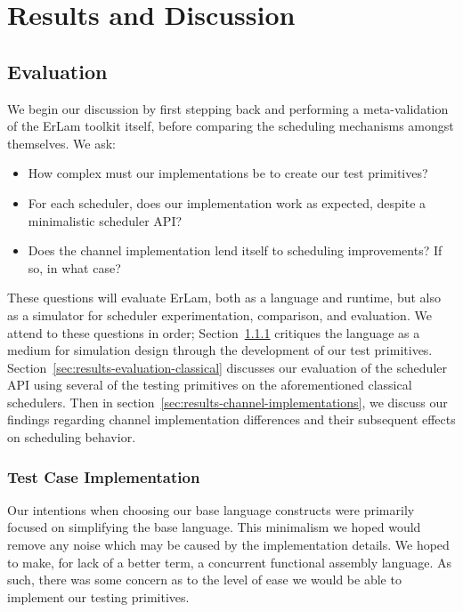 \chapter{Results and Discussion}
%
\label{chap:results}

\section{Evaluation}\label{sec:results-evaluation}

We begin our discussion by first stepping back and performing a meta-validation 
of the ErLam toolkit itself, before comparing the scheduling mechanisms amongst 
themselves. We ask:
\vspace{-3mm}\begin{itemize}
    \item How complex must our implementations be to create our test primitives? 
    \item For each scheduler, does our implementation work as expected, despite a minimalistic scheduler API?
    \item Does the channel implementation lend itself to scheduling improvements? If so, in what case?
\end{itemize}\vspace{-3mm}
These questions will evaluate ErLam, both as a language and runtime, but also as a 
simulator for scheduler experimentation, comparison, and evaluation. We attend to
these questions in order;
Section~\ref{sec:results-test-case-implementation} critiques the language as a 
medium for simulation design through the development of our test primitives.
Section~\ref{sec:results-evaluation-classical} discusses our evaluation of the
scheduler API using several of the testing primitives on the aforementioned 
classical schedulers. 
Then in section~\ref{sec:results-channel-implementations}, we discuss our findings 
regarding channel implementation differences and their subsequent effects on 
scheduling behavior.

\subsection{Test Case Implementation}\label{sec:results-test-case-implementation}

Our intentions when choosing our base language constructs were primarily focused on 
simplifying the base language. This minimalism we hoped would remove any noise 
which may be caused by the implementation details. We hoped to make, for lack of a better
term, a concurrent functional assembly language. As such, there was some concern
as to the level of ease we would be able to implement our testing primitives.

